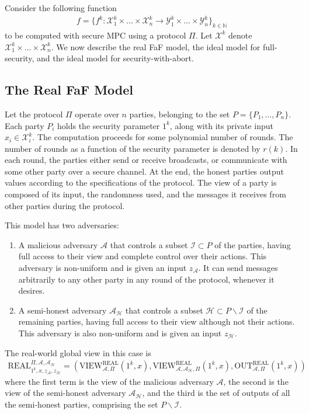 \documentclass[11pt, a4paper]{article}
\theoremstyle{definition}
\theoremstyle{remark}
\begin{document}
Consider the following function
\begin{align*}
    f = \{f^k:\mathcal{X}_1^k\times\dots\times\mathcal{X}_n^k\rightarrow\mathcal{Y}_1^k\times\dots\times\mathcal{Y}_n^k\}_{k\in\mathbb{N}}
\end{align*}
to be computed with secure MPC using a protocol $\Pi$. Let $\mathcal{X}^k$ denote $\mathcal{X}_1^k\times\dots\times\mathcal{X}_n^k$. We now describe the real FaF model, the ideal model for full-security, and the ideal model for security-with-abort.

\subsection{The Real FaF Model}

Let the protocol $\Pi$ operate over $n$ parties, belonging to the set $P=\{P_1,\dots,P_n\}$. Each party $P_i$ holds the security parameter $1^k$, along with its private input $x_i\in\mathcal{X}_i^k$. The computation proceeds for some polynomial number of rounds. The number of rounds as a function of the security parameter is denoted by $r(k)$. In each round, the parties either send or receive broadcasts, or communicate with some other party over a secure channel. At the end, the honest parties output values according to the specifications of the protocol. The view of a party is composed of its input, the randomness used, and the messages it receives from other parties during the protocol.

\medskip

This model has two adversaries:
\begin{enumerate}
    \item A malicious adversary $\mathcal{A}$ that controls a subset $\mathcal{I}\subset P$ of the parties, having full access to their view and complete control over their actions. This adversary is non-uniform and is given an input $z_{\mathcal{A}}$. It can send messages arbitrarily to any other party in any round of the protocol, whenever it desires.
    \item A semi-honest adversary $\mathcal{A}_{\mathcal{H}}$ that controls a subset $\mathcal{H}\subset P\backslash\mathcal{I}$ of the remaining parties, having full access to their view although not their actions. This adversary is also non-uniform and is given an input $z_{\mathcal{H}}$.
\end{enumerate}
The real-world global view in this case is
\begin{align*}
    \text{REAL}_{1^k,x,z_{\mathcal{A}},z_{\mathcal{H}}}^{\Pi,\mathcal{A},\mathcal{A}_\mathcal{H}} = \left(\text{VIEW}^{\text{REAL}}_{\mathcal{A},\Pi}(1^k,x), \text{VIEW}^{\text{REAL}}_{\mathcal{A},\mathcal{A}_{\mathcal{H}}, \Pi}(1^k,x), \text{OUT}^{\text{REAL}}_{\mathcal{A},\Pi}(1^k,x)\right)
\end{align*}
where the first term is the view of the malicious adversary $\mathcal{A}$, the second is the view of the semi-honest adversary $\mathcal{A}_{\mathcal{H}}$, and the third is the set of outputs of all the semi-honest parties, comprising the set $P\backslash\mathcal{I}$.
\end{document}
